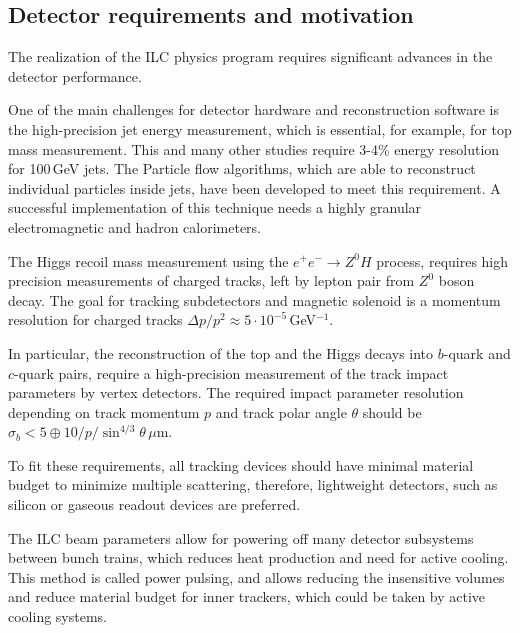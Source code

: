 


\subsection{Detector requirements and motivation}

The realization of the ILC physics program requires significant advances in the detector performance. 

One of the main challenges for detector hardware and reconstruction software is the high-precision jet energy measurement, which is essential, for example, for top mass measurement. This and many other studies require 3-4\%  energy resolution for 100\,GeV jets.
The Particle flow algorithms, which are able to reconstruct individual particles inside jets, have been developed to meet this requirement. 
A successful implementation of this technique needs a highly granular electromagnetic and hadron calorimeters.

The Higgs recoil mass measurement using the $e^+e^- \to Z^0H$ process, requires high precision measurements of charged tracks, left by lepton pair from $Z^0$ boson decay. The goal for tracking subdetectors and magnetic solenoid is a momentum resolution for charged tracks $\Delta p/ p^2 \approx 5 \cdot 10^{-5}$\,GeV$^{-1}$.

In particular, the reconstruction of the top and the Higgs decays into $b$-quark and $c$-quark pairs, require a high-precision measurement of the track impact parameters by vertex detectors. 
The required impact parameter resolution depending on track momentum $p$ and track polar angle $\theta$ should be $\sigma_b < 5  \oplus 10/p/\sin^{4/3}\theta$\,$\mu$m.

To fit these requirements, all tracking devices should have minimal material budget to minimize multiple scattering, therefore, lightweight detectors, such as silicon or gaseous readout devices are preferred.

The ILC beam parameters allow for powering off many detector subsystems between bunch trains, which reduces heat production and need for active cooling. This method is called power pulsing, and allows reducing the insensitive volumes and reduce material budget for inner trackers, which could be taken by active cooling systems. 


